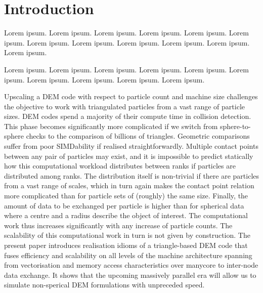 \section{Introduction}

Lorem ipsum. Lorem ipsum. Lorem ipsum. Lorem ipsum. Lorem ipsum. Lorem ipsum.
Lorem ipsum. Lorem ipsum. Lorem ipsum. Lorem ipsum. Lorem ipsum. Lorem ipsum. 

Lorem ipsum. Lorem ipsum. Lorem ipsum. Lorem ipsum.
Lorem ipsum. Lorem ipsum. Lorem ipsum. Lorem ipsum. Lorem ipsum. Lorem ipsum. 

Upscaling a DEM code with respect to particle count and machine size 
challenges the objective to work with triangulated particles from a vast range
of particle sizes.
DEM codes spend a majority of their compute time in collision detection.
This phase becomes significantly more complicated if we switch from
sphere-to-sphere checks to the comparison of billions of triangles.
Geometric comparisons suffer from poor SIMDability if realised
straightforwardly.
Multiple contact points between any pair of particles may exist, and it is
impossible to predict statically how this computational workload distributes
between ranks if particles are distributed among ranks. 
The distribution itself is non-trivial if there are particles from a vast range
of scales, which in turn again makes the contact point relation more complicated
than for particle sets of (roughly) the same size.
Finally, the amount of data to be exchanged per particle is higher
than for spherical data where a centre and a radius describe the object of interest. 
The computational work thus increases significantly with any increase of
particle counts.
The scalability of this computational work in turn is not given by construction.
The present paper introduces realisation idioms of a triangle-based DEM code
that fuses efficiency and scalability on all levels of the machine architecture spanning from
vectorisation and memory access characteristics over manycore to inter-node
data exchange.
It shows that the upcoming massively parallel era will allow us to
simulate non-sperical DEM formulations with unpreceded speed.   

